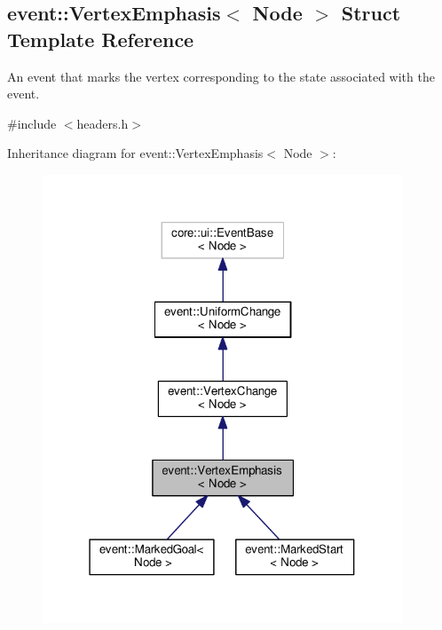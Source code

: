 \hypertarget{structevent_1_1VertexEmphasis}{}\subsection{event\+:\+:Vertex\+Emphasis$<$ Node $>$ Struct Template Reference}
\label{structevent_1_1VertexEmphasis}


An event that marks the vertex corresponding to the state associated with the event.  




{\ttfamily \#include $<$headers.\+h$>$}



Inheritance diagram for event\+:\+:Vertex\+Emphasis$<$ Node $>$\+:\nopagebreak
\begin{figure}[H]
\begin{center}
\leavevmode
\includegraphics[width=304pt]{structevent_1_1VertexEmphasis__inherit__graph}
\end{center}
\end{figure}


